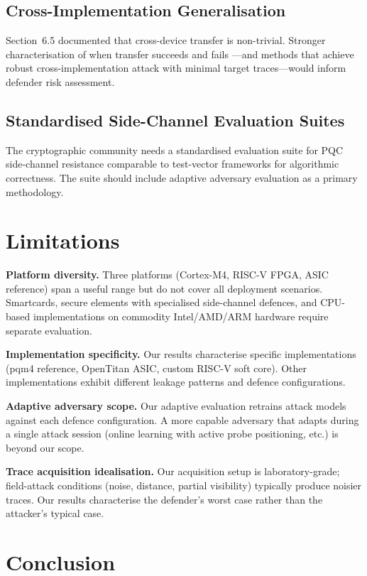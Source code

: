 \documentclass[sigconf,nonacm]{acmart}
\begin{document}
\subsection{Cross-Implementation Generalisation}

Section~6.5 documented that cross-device transfer is non-trivial.
Stronger characterisation of when transfer succeeds and fails
---and methods that achieve robust cross-implementation attack with
minimal target traces---would inform defender risk assessment.

\subsection{Standardised Side-Channel Evaluation Suites}

The cryptographic community needs a standardised evaluation suite for
PQC side-channel resistance comparable to test-vector frameworks for
algorithmic correctness. The suite should include adaptive adversary
evaluation as a primary methodology.

\section{Limitations}

\textbf{Platform diversity.} Three platforms (Cortex-M4, RISC-V FPGA,
ASIC reference) span a useful range but do not cover all deployment
scenarios. Smartcards, secure elements with specialised side-channel
defences, and CPU-based implementations on commodity Intel/AMD/ARM
hardware require separate evaluation.

\textbf{Implementation specificity.} Our results characterise specific
implementations (pqm4 reference, OpenTitan ASIC, custom RISC-V soft
core). Other implementations exhibit different leakage patterns and
defence configurations.

\textbf{Adaptive adversary scope.} Our adaptive evaluation retrains
attack models against each defence configuration. A more capable
adversary that adapts during a single attack session (online learning
with active probe positioning, etc.) is beyond our scope.

\textbf{Trace acquisition idealisation.} Our acquisition setup is
laboratory-grade; field-attack conditions (noise, distance, partial
visibility) typically produce noisier traces. Our results characterise
the defender's worst case rather than the attacker's typical case.

\section{Conclusion}
\end{document}
